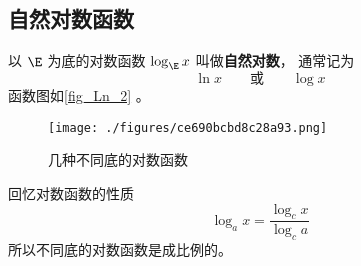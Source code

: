
\begin{issues}
\issueDraft
\end{issues}

\subsection{自然对数函数}
以 $\E$ 为底的对数函数 $\log_{\E} x$ 叫做\textbf{自然对数}， 通常记为
\begin{equation}
\ln x \qquad \text{或} \qquad \log x
\end{equation}
函数图如\autoref{fig_Ln_2} 。
\begin{figure}[ht]
\centering
\texttt{[image: ./figures/ce690bcbd8c28a93.png]}
\caption{几种不同底的对数函数} \label{fig_Ln_2}
\end{figure}
回忆对数函数的性质
\begin{equation}
\log_a x = \frac{\log_c x}{\log_c a}
\end{equation}
所以不同底的对数函数是成比例的。